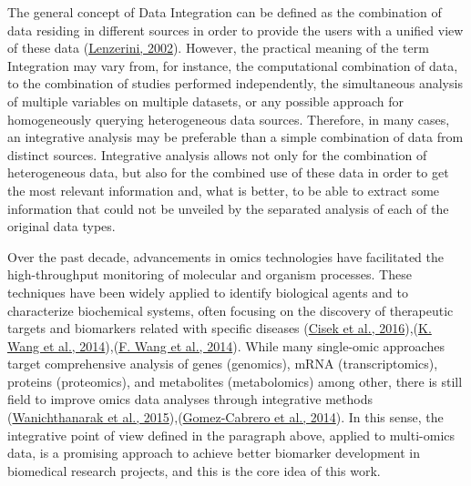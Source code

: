 \documentclass[a4paper, nobind]{templates/ociamthesis}
\begin{document}
The general concept of Data Integration can be defined as the combination of data residing in different sources in order to provide the users with a unified view of these data (\protect\hyperlink{ref-lenzerini_data_2002}{Lenzerini, 2002}). However, the practical meaning of the term Integration may vary from, for instance, the computational combination of data, to the combination of studies performed independently, the simultaneous analysis of multiple variables on multiple datasets, or any possible approach for homogeneously querying heterogeneous data sources. Therefore, in many cases, an integrative analysis may be preferable than a simple combination of data from distinct sources. Integrative analysis allows not only for the combination of heterogeneous data, but also for the combined use of these data in order to get the most relevant information and, what is better, to be able to extract some information that could not be unveiled by the separated analysis of each of the original data types.

Over the past decade, advancements in omics technologies have facilitated the high-throughput monitoring of molecular and organism processes. These techniques have been widely applied to identify biological agents and to characterize biochemical systems, often focusing on the discovery of therapeutic targets and biomarkers related with specific diseases (\protect\hyperlink{ref-cisek_application_2016}{Cisek et al., 2016}),(\protect\hyperlink{ref-wang_proteomics_2014}{K. Wang et al., 2014}),(\protect\hyperlink{ref-wang_circulating_2014}{F. Wang et al., 2014}). While many single-omic approaches target comprehensive analysis of genes (genomics), mRNA (transcriptomics), proteins (proteomics), and metabolites (metabolomics) among other, there is still field to improve omics data analyses through integrative methods (\protect\hyperlink{ref-wanichthanarak_genomic_2015}{Wanichthanarak et al., 2015}),(\protect\hyperlink{ref-gomez-cabrero_data_2014}{Gomez-Cabrero et al., 2014}). In this sense, the integrative point of view defined in the paragraph above, applied to multi-omics data, is a promising approach to achieve better biomarker development in biomedical research projects, and this is the core idea of this work.
\end{document}
